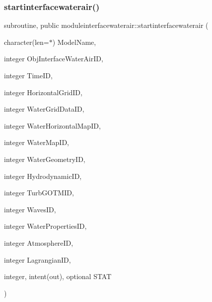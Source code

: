 \subsubsection{\texorpdfstring{startinterfacewaterair()}{startinterfacewaterair()}}
{\footnotesize\ttfamily subroutine, public moduleinterfacewaterair\+::startinterfacewaterair (\begin{DoxyParamCaption}\item[{character(len=$\ast$)}]{Model\+Name,  }\item[{integer}]{Obj\+Interface\+Water\+Air\+ID,  }\item[{integer}]{Time\+ID,  }\item[{integer}]{Horizontal\+Grid\+ID,  }\item[{integer}]{Water\+Grid\+Data\+ID,  }\item[{integer}]{Water\+Horizontal\+Map\+ID,  }\item[{integer}]{Water\+Map\+ID,  }\item[{integer}]{Water\+Geometry\+ID,  }\item[{integer}]{Hydrodynamic\+ID,  }\item[{integer}]{Turb\+G\+O\+T\+M\+ID,  }\item[{integer}]{Waves\+ID,  }\item[{integer}]{Water\+Properties\+ID,  }\item[{integer}]{Atmosphere\+ID,  }\item[{integer}]{Lagrangian\+ID,  }\item[{integer, intent(out), optional}]{S\+T\+AT }\end{DoxyParamCaption})}

